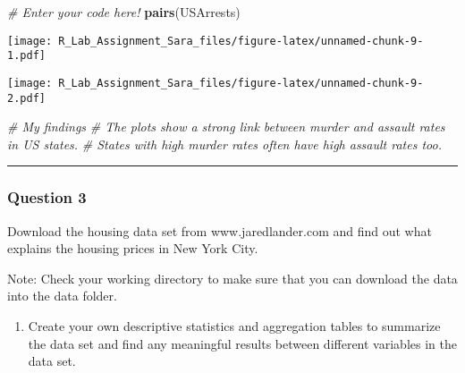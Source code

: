\documentclass[
]{article}
\newenvironment{Shaded}{\begin{snugshade}}{\end{snugshade}}
\newcommand{\AttributeTok}[1]{\textcolor[rgb]{0.13,0.29,0.53}{#1}}
\newcommand{\CommentTok}[1]{\textcolor[rgb]{0.56,0.35,0.01}{\textit{#1}}}
\newcommand{\FunctionTok}[1]{\textcolor[rgb]{0.13,0.29,0.53}{\textbf{#1}}}
\newcommand{\NormalTok}[1]{#1}
\newcommand{\SpecialCharTok}[1]{\textcolor[rgb]{0.81,0.36,0.00}{\textbf{#1}}}
\newcommand{\StringTok}[1]{\textcolor[rgb]{0.31,0.60,0.02}{#1}}
\providecommand{\tightlist}{%
  \setlength{\itemsep}{0pt}\setlength{\parskip}{0pt}}
\begin{document}
\begin{Shaded}
\begin{Highlighting}[]
\CommentTok{\# Enter your code here!}
\FunctionTok{pairs}\NormalTok{(USArrests)}
\end{Highlighting}
\end{Shaded}

\texttt{[image: R\_Lab\_Assignment\_Sara\_files/figure-latex/unnamed-chunk-9-1.pdf]}

\begin{Shaded}
\end{Shaded}

\texttt{[image: R\_Lab\_Assignment\_Sara\_files/figure-latex/unnamed-chunk-9-2.pdf]}

\begin{Shaded}
\begin{Highlighting}[]
\CommentTok{\# My findings}
\CommentTok{\#   The plots show a strong link between murder and assault rates in US states.}
\CommentTok{\#   States with high murder rates often have high assault rates too.}
\end{Highlighting}
\end{Shaded}

\begin{center}\rule{0.5\linewidth}{0.5pt}\end{center}

\subsubsection{Question 3}\label{question-3}

Download the housing data set from www.jaredlander.com and find out what
explains the housing prices in New York City.

Note: Check your working directory to make sure that you can download
the data into the data folder.

\begin{enumerate}
\def\labelenumi{\alph{enumi}.}
\tightlist
\item
  Create your own descriptive statistics and aggregation tables to
  summarize the data set and find any meaningful results between
  different variables in the data set.
\end{enumerate}
\end{document}
